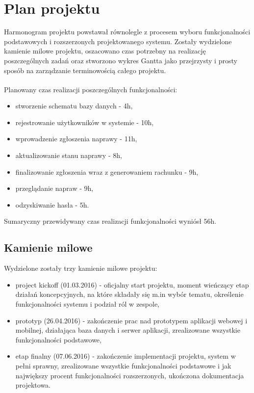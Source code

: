 \documentclass[a4paper,11pt]{article}
\begin{document}
\section{Plan projektu}
Harmonogram projektu powstawał równolegle z procesem wyboru funkcjonalności podstawowych i rozszerzonych projektowanego systemu. Zostały wydzielone kamienie milowe projektu, oszacowano czas potrzebny na realizację poszczególnych zadań oraz stworzono wykres Gantta jako przejrzysty i prosty sposób na zarządzanie terminowością całego projektu.
\\\\Planowany czas realizacji poszczególnych funkcjonalności:
\begin{itemize}
	\item stworzenie schematu bazy danych - 4h, 
	\item rejestrowanie użytkowników w systemie - 10h, 
	\item wprowadzenie zgłoszenia naprawy - 11h,
	\item aktualizowanie stanu naprawy - 8h,
	\item finalizowanie zgłoszenia wraz z generowaniem rachunku - 9h,
	\item przeglądanie napraw - 9h,
	\item odzyskiwanie hasła - 5h.
\end{itemize}
Sumaryczny przewidywany czas realizacji funkcjonalności wyniósł 56h.
\subsection{Kamienie milowe}
Wydzielone zostały trzy kamienie milowe projektu:
\begin{itemize}
	\item project kickoff (01.03.2016) - oficjalny start projektu, moment wieńczący etap działań koncepcyjnych, na które składały się m.in wybór tematu, określenie funkcjonalności systemu i podział ról w zespole,
	\item prototyp (26.04.2016) - zakończenie prac nad prototypem aplikacji webowej i mobilnej, działająca baza danych i serwer aplikacji, zrealizowane wszystkie funkcjonalności podstawowe,
	\item etap finalny (07.06.2016) - zakończenie implementacji projektu, system w pełni sprawny, zrealizowane wszystkie funkcjonalności podstawowe i jak największy procent funkcjonalności rozszerzonych, ukończona dokumentacja projektowa.
\end{itemize}
\end{document}
